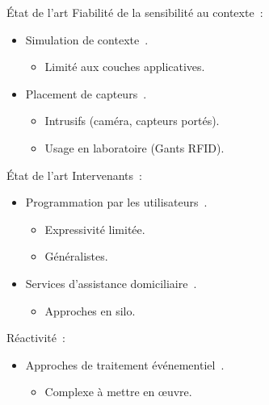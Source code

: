 \begin{frame}{État de l'art}
  Fiabilité de la sensibilité au contexte~:\\
  \begin{itemize}
  \item Simulation de contexte~\cite{bruno2009diasim}.
    \begin{itemize}[label=--,font=\LARGE \color{black}]
    \item Limité aux couches applicatives.
    \end{itemize}
  \item Placement de capteurs~\cite{hong2013toward,murao2013evaluation,beckmann2004some}.
    \begin{itemize}[label=--,font=\LARGE \color{black}]
    \item Intrusifs (caméra, capteurs portés).
    \item Usage en laboratoire (Gants RFID).
    \end{itemize}
  \end{itemize}

\end{frame}
\begin{frame}{État de l'art}
  Intervenants~:
  \begin{itemize}
  \item Programmation par les utilisateurs~\cite{resnick2009scratch,coutaz2016first,criel2011deconstructing}.
    \begin{itemize}[label=--,font=\LARGE \color{black}]
    \item Expressivité limitée.
    \item Généralistes.
    \end{itemize}
  \item Services d'assistance domiciliaire~\cite{hoque2015holmes,lee2015sensor,baecker2014technology}.
    \begin{itemize}[label=--,font=\LARGE \color{black}]
    \item Approches en silo.
    \end{itemize}
  \end{itemize}

  Réactivité~:
  \begin{itemize}
  \item Approches de traitement événementiel~\cite{cugola2012processing}.
    \begin{itemize}[label=--,font=\LARGE \color{black}]
    \item Complexe à mettre en {\oe}uvre.
    \end{itemize}
  \end{itemize}
\end{frame}

